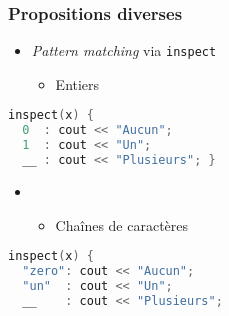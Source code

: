 \documentclass[C++.tex]{subfiles}
\begin{document}
\begin{frame}[fragile]
	\frametitle{Propositions diverses}
	\begin{itemize}
		\item \textit{Pattern matching} via \lstinline|inspect|


		\begin{itemize}
			\item Entiers
		\end{itemize}
	\end{itemize}

	\begin{lstlisting}[language=C++]
inspect(x) {
  0  : cout << "Aucun";
  1  : cout << "Un";
  __ : cout << "Plusieurs"; }\end{lstlisting}


	\begin{itemize}
		\item [] \begin{itemize}
			\item Chaînes de caractères
		\end{itemize}
	\end{itemize}

	\begin{lstlisting}[language=C++]
inspect(x) {
  "zero": cout << "Aucun";
  "un"  : cout << "Un";
  __    : cout << "Plusieurs";\end{lstlisting}
\end{frame}
\end{document}
